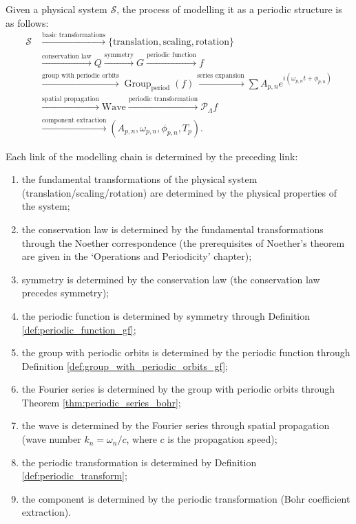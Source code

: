 \begin{definition}
\label{def:modelling_chain}
Given a physical system $\mathcal{S}$, the process of modelling it as a periodic structure is as follows:
\[
\begin{aligned}
\mathcal{S}
&\xrightarrow{\text{basic transformations}}
\{\text{translation}, \text{scaling}, \text{rotation}\} \\
&\xrightarrow{\text{conservation law}} Q
\xrightarrow{\text{symmetry}} G
\xrightarrow{\text{periodic function}} f \\
&\xrightarrow{\text{group with periodic orbits}} \operatorname{Group}_{\mathrm{period}}(f)
\xrightarrow{\text{series expansion}} \sum A_{p,n} e^{i(\omega_{p,n} t + \phi_{p,n})} \\
&\xrightarrow{\text{spatial propagation}} \text{Wave}
\xrightarrow{\text{periodic transformation}} \mathcal{P}_\Lambda f \\
&\xrightarrow{\text{component extraction}} (A_{p,n}, \omega_{p,n}, \phi_{p,n}, T_p).
\end{aligned}
\]
\end{definition}

\begin{remark}\label{rem:modelling_chain_consistency}
Each link of the modelling chain is determined by the preceding link:
\begin{enumerate}[label=(\roman*)]
    \item the fundamental transformations of the physical system (translation/scaling/rotation) are determined by the physical properties of the system;
    \item the conservation law is determined by the fundamental transformations through the Noether correspondence (the prerequisites of Noether's theorem are given in the `Operations and Periodicity' chapter);
    \item symmetry is determined by the conservation law (the conservation law precedes symmetry);
    \item the periodic function is determined by symmetry through Definition \ref{def:periodic_function_gf};
    \item the group with periodic orbits is determined by the periodic function through Definition \ref{def:group_with_periodic_orbits_gf};
    \item the Fourier series is determined by the group with periodic orbits through Theorem \ref{thm:periodic_series_bohr};
    \item the wave is determined by the Fourier series through spatial propagation (wave number $k_n = \omega_n / c$, where $c$ is the propagation speed);
    \item the periodic transformation is determined by Definition \ref{def:periodic_transform};
    \item the component is determined by the periodic transformation (Bohr coefficient extraction).
\end{enumerate}
\end{remark}

